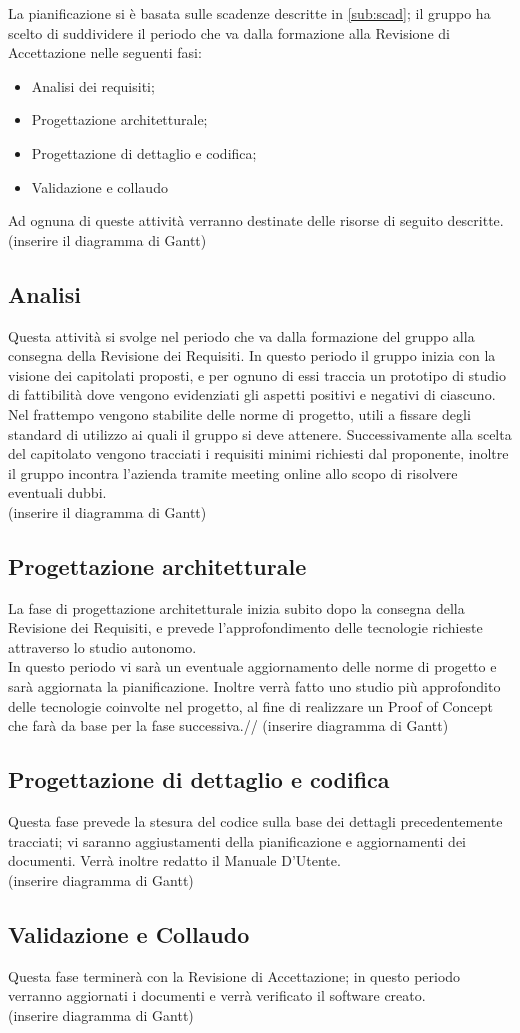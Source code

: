 \documentclass[../piano_di_progetto.tex]{subfiles}
\begin{document}
La pianificazione si è basata sulle scadenze descritte in \ref{sub:scad}; il gruppo ha scelto di suddividere il periodo che va dalla formazione alla Revisione di Accettazione nelle seguenti fasi:
\begin{itemize}
\item Analisi dei requisiti;
\item Progettazione architetturale;
\item Progettazione di dettaglio e codifica;
\item Validazione e collaudo
\end{itemize}
Ad ognuna di queste attività verranno destinate delle risorse di seguito descritte.
(inserire il diagramma di Gantt)

\subsection{Analisi}%
\label{sub:analisi}
Questa attività si svolge nel periodo che va dalla formazione del gruppo alla consegna della Revisione dei Requisiti. In questo periodo il gruppo inizia con la visione dei capitolati proposti, e per ognuno di essi traccia un prototipo di studio di fattibilità dove vengono evidenziati gli aspetti positivi e negativi di ciascuno. Nel frattempo vengono stabilite delle norme di progetto, utili a fissare degli standard di utilizzo ai quali il gruppo si deve attenere. Successivamente alla scelta del capitolato vengono tracciati i requisiti minimi richiesti dal proponente, inoltre il gruppo incontra l’azienda tramite meeting online allo scopo di risolvere eventuali dubbi. \\
(inserire il diagramma di Gantt)

\subsection{Progettazione architetturale}%
\label{sub:prog_arc}
La fase di progettazione architetturale inizia subito dopo la consegna della Revisione dei Requisiti, e prevede l’approfondimento delle tecnologie richieste attraverso lo studio autonomo. \\
In questo periodo vi sarà un eventuale aggiornamento delle norme di progetto e sarà aggiornata la pianificazione. Inoltre verrà fatto uno studio più approfondito delle tecnologie coinvolte nel progetto, al fine di realizzare un Proof of Concept che farà da base per la fase successiva.//
(inserire diagramma di Gantt)

\subsection{Progettazione di dettaglio e codifica}%
\label{sub:prog_dett}
Questa fase prevede la stesura del codice sulla base dei dettagli precedentemente tracciati; vi saranno aggiustamenti della pianificazione e aggiornamenti dei documenti. Verrà inoltre redatto il Manuale D’Utente.\\
(inserire diagramma di Gantt)

\subsection{Validazione e Collaudo}%
\label{sub:valid_coll}
Questa fase terminerà con la Revisione di Accettazione; in questo periodo verranno aggiornati i documenti e verrà verificato il software creato. \\
(inserire diagramma di Gantt)
\end{document}
